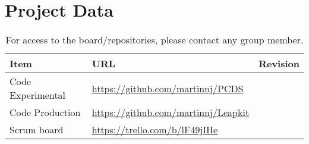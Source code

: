 \section{Project Data}
\begin{table}[h!]
    \begin{tabular}{l|l|l}
        \textbf{Item}            & \textbf{URL}                              & \textbf{Revision}\\\hline
        Code Experimental & \url{https://github.com/martinnj/PCDS}    & \texttt{}\\
        Code Production   & \url{https://github.com/martinnj/Leapkit} & \texttt{}\\
        Scrum board              & \url{https://trello.com/b/lF49jIHe}       & \texttt{}
    \end{tabular}
    \label{tab:projdata}
    \caption{For access to the board/repositories, please contact any group member.}
\end{table}
